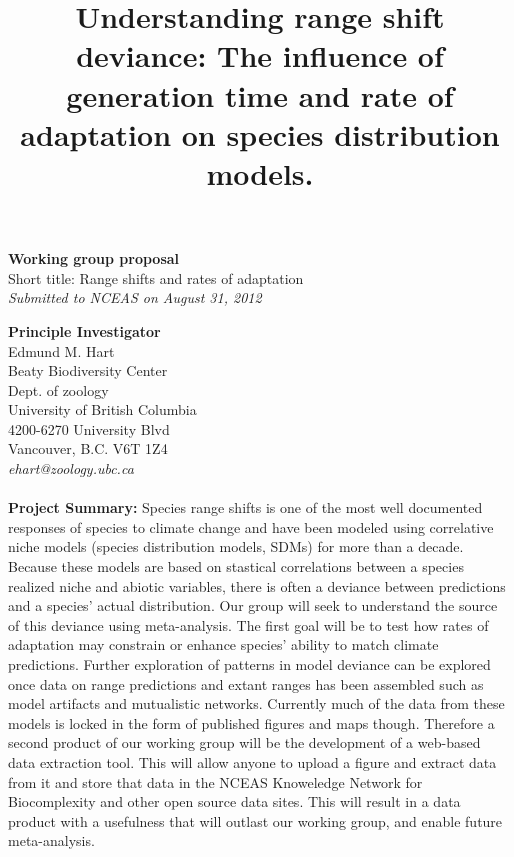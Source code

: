 \documentclass[pdftex,11pt,a4paper]{article}\usepackage{graphicx, color}
\begin{document}
\title{Understanding range shift deviance: The influence of generation time and rate of adaptation on species distribution models.}
 \date{}
\maketitle

{\bf  Working group proposal \\}
Short title: Range shifts and rates of adaptation \\
{\it Submitted to NCEAS on August 31, 2012\\}

{\bf Principle Investigator\\}
Edmund M. Hart\\
Beaty Biodiversity Center\\
Dept. of zoology\\
University of British Columbia\\
4200-6270 University Blvd\\
Vancouver, B.C. V6T 1Z4\\
{\it ehart@zoology.ubc.ca}\\
\\


{\bf Project Summary:} Species range shifts is one of the most well documented responses of species to climate change and have been modeled  using correlative niche models (species distribution models, SDMs) for more than a decade.  Because these models are based on stastical correlations between a species realized niche and abiotic variables, there is often a deviance between predictions and a species' actual distribution.  Our group will seek to understand the source of this deviance using meta-analysis.  The first goal will be to test how rates of adaptation may constrain or enhance species' ability to match climate predictions. Further exploration of patterns in model deviance can be explored once data on range predictions and extant ranges has been assembled such as model artifacts and mutualistic networks. Currently much of the data from these models is locked in the form of published figures and maps though.  Therefore a second product of our working group will be the development of a web-based data extraction tool. This will allow anyone to upload a figure and extract data from it and store that data in the NCEAS Knoweledge Network for Biocomplexity and other open source data sites.  This will result in a data product with a usefulness that will outlast our working group, and enable future meta-analysis.

\



\end{document}
